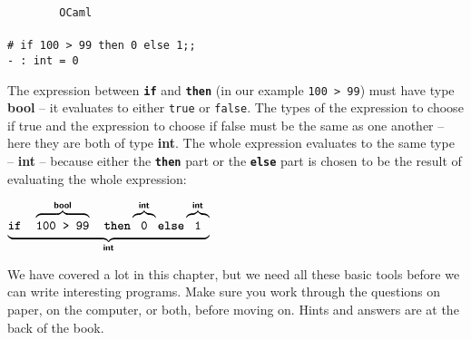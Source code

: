 \documentclass[]{book}
\newcommand{\smspace}{\vspace{4mm}}
\begin{document}
\smspace
\noindent\verb!        OCaml!\\
\noindent\\
\noindent\texttt{\# if 100 > 99 then 0 else 1;;}\\
\noindent\texttt{- :\ int = 0} 
\smspace

\noindent The expression between \texttt{\textbf{if}} and \texttt{\textbf{then}} (in our example \texttt{100 > 99}) must have type \textbf{\textsf{bool}} -- it evaluates to either \texttt{true} or \texttt{false}. The types of the expression to choose if true and the expression to choose if false must be the same as one another -- here they are both of type \textbf{\textsf{int}}. The whole expression evaluates to the same type -- \textbf{\textsf{int}} -- because either the \texttt{\textbf{then}} part or the \texttt{\textbf{else}} part is chosen to be the result of evaluating the whole expression:


\smspace
$\underbrace{\vphantom{g}\texttt{\textbf{if}}\ \ \ \overbrace{\texttt{\strut 100 > 99}}^{\textbf{\textsf{bool}}}\ \ \ \texttt{\textbf{then}} \overbrace{\texttt{\strut 0}}^{\textbf{\textsf{int}}} \texttt{\textbf{else}} \overbrace{\texttt{\strut 1}}^{\textbf{\textsf{int}}}}_{\textsf{\textbf{int}}}$
\smspace

\noindent We have covered a lot in this chapter, but we need all these basic tools before we can write interesting programs. Make sure you work through the questions on paper, on the computer, or both, before moving on. Hints and answers are at the back of the book.

\clearpage
\end{document}
